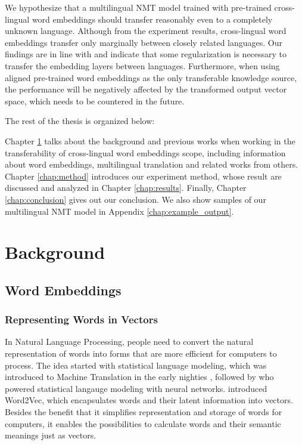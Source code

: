 \documentclass[thesis,fonts=libertine]{cluu}
\begin{document}
We hypothesize that a multilingual NMT model trained with pre-trained cross-lingual word embeddings should transfer reasonably even to a completely unknown language. Although from the experiment results, cross-lingual word embeddings transfer only marginally between closely related languages. Our findings are in line with \textcite{aji-etal-2020-neural} and indicate that some regularization is necessary to transfer the embedding layers between languages. Furthermore, when using aligned pre-trained word embeddings as the only transferable knowledge source, the performance will be negatively affected by the transformed output vector space, which needs to be countered in the future.

The rest of the thesis is organized below:

Chapter \ref{chap:background} talks about the background and previous works when working in the transferability of cross-lingual word embeddings scope, including information about word embeddings, multilingual translation and related works from others. Chapter \ref{chap:method} introduces our experiment method, whose result are discussed and analyzed in Chapter \ref{chap:results}. Finally, Chapter \ref{chap:conclusion} gives out our conclusion. We also show samples of our multilingual NMT model in Appendix \ref{chap:example_output}.

\chapter{Background}
\label{chap:background}

\section{Word Embeddings}
\subsection{Representing Words in Vectors}

In Natural Language Processing, people need to convert the natural representation of words into forms that are more efficient for computers to process. The idea started with statistical language modeling, which was introduced to Machine Translation in the early nighties \parencite{brown-etal-1990-statistical}, followed by \textcite{bengio2003neural} who powered statistical langauge modeling with neural networks. \textcite{Mikolov:2013aa} introduced Word2Vec, which encapsulates words and their latent information into vectors. Besides the benefit that it simplifies representation and storage of words for computers, it enables the possibilities to calculate words and their semantic meanings just as vectors.
\end{document}
